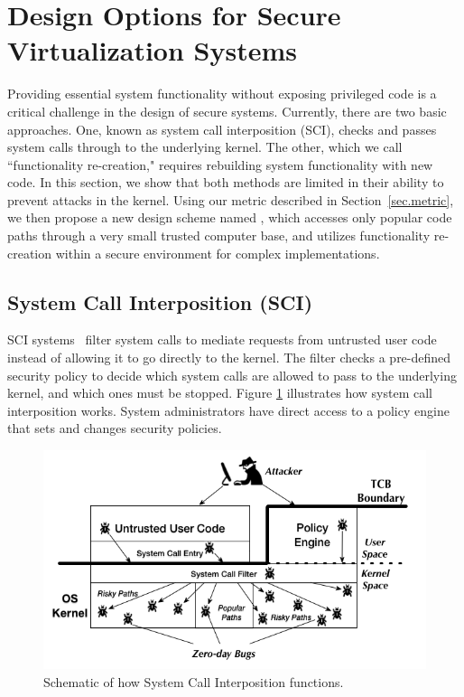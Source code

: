 \section{Design Options for Secure Virtualization Systems}
\label{sec.design}

Providing essential system functionality without exposing privileged code is a
critical challenge in the design of secure systems.
Currently, there are two basic approaches.
One, known as system call interposition (SCI), checks and passes system calls
through to the underlying kernel. The other, which we call ``functionality
re-creation," requires rebuilding system functionality with new code. In this
section, we show that both methods are limited in their ability to
prevent attacks in the kernel.
Using our metric described in Section~\ref{sec.metric},
we then propose a new design scheme named \lip, which accesses only popular
code paths through a very small trusted computer base, and utilizes
functionality re-creation within a secure environment for complex implementations.

\subsection{System Call Interposition (SCI)}
SCI systems~\cite{Janus0:96, Janus:99} filter system calls to mediate requests
from untrusted user code instead of allowing it to go directly to the kernel.
The filter checks a pre-defined security policy to decide which system calls are
allowed to pass to the underlying kernel, and which ones must be stopped.
Figure \ref{fig:design_system_call_interposition} illustrates how
system call interposition works. System administrators have direct access to a policy engine that sets and changes security policies.

\begin{figure}%
\centering
\includegraphics[width=1.0\columnwidth]{diagram/Virtualization_Design_Model_03.png}
\caption{\small Schematic of how System Call Interposition functions.}
\label{fig:design_system_call_interposition}
\end{figure}

